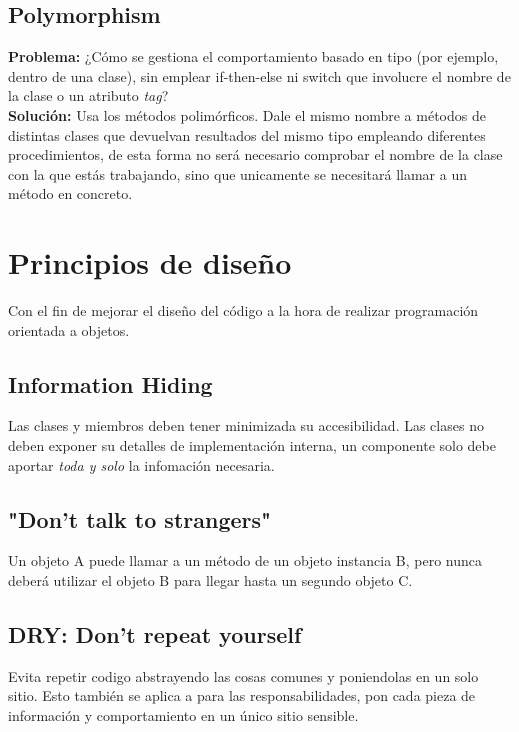 \documentclass[11pt]{article}
\theoremstyle{plain}
\begin{document}
        \subsection{Polymorphism} %
        \label{sub:polymorphism}
        \begin{center}
            \textbf{Problema:} ¿Cómo se gestiona el comportamiento basado en tipo (por ejemplo, dentro de una clase), sin emplear if-then-else ni switch que involucre el nombre de la clase o un atributo \textit{tag}?\\ 
            \textbf{Solución:} Usa los métodos polimórficos. Dale el mismo nombre a métodos de distintas clases que devuelvan resultados del mismo tipo empleando diferentes procedimientos, de esta forma no será necesario comprobar el nombre de la clase con la que estás trabajando, sino que unicamente se necesitará llamar a un método en concreto.
        \end{center}
    \section{Principios de diseño} %
    \label{sec:principios_de_diseño}
        Con el fin de mejorar el diseño del código a la hora de realizar programación orientada a objetos.
        \subsection{Information Hiding} %
        \label{sub:information_hiding}
            Las clases y miembros deben tener minimizada su accesibilidad. Las clases no deben exponer su detalles de implementación interna, un componente solo debe aportar \textit{toda y solo} la infomación necesaria.
        \subsection{"Don't talk to strangers"} %
        \label{sub:_don_t_talk_to_strangers_}
            Un objeto A puede llamar a un método de un objeto instancia B, pero nunca deberá utilizar el objeto B para llegar hasta un segundo objeto C.
        
        \subsection{DRY: Don't repeat yourself} %
        \label{sub:dry_don_t_repeat_yourself}
            Evita repetir codigo abstrayendo las cosas comunes y poniendolas en un solo sitio. Esto también se aplica a para las responsabilidades, pon cada pieza de información y comportamiento en un único sitio sensible.
\end{document}
